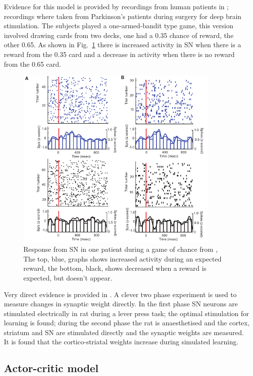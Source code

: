 \documentclass[11pt,a4paper]{scrartcl}
\begin{document}
Evidence for this model is provided by recordings from human patients
in \cite{ZaghloulEtAl2009a}; recordings where taken from Parkinson's
patients during surgery for deep brain stimulation. The subjects
played a one-armed-bandit type game, this version involved drawing
cards from two decks, one had a 0.35 chance of reward, the other
0.65. As shown in Fig.~\ref{fig:human} there is increased activity in
SN when there is a reward from the 0.35 card and a decrease in
activity when there is no reward from the 0.65 card.


\begin{figure}
\begin{center}
\includegraphics[width=10cm]{human.png}%
\end{center}
\caption{Response from SN in one patient during a game of chance from \cite{ZaghloulEtAl2009a}, The top, blue, graphs shows increased activity during an expected reward, the bottom, black, shows decreased when a reward is expected, but doesn't appear. \label{fig:human}}
\end{figure}

Very direct evidence is provided in
\cite{ReynoldsHylandWickens2001a}. A clever two phase experiment is
used to measure changes in synaptic weight directly. In the first
phase SN neurons are stimulated electrically in rat during a lever
press task; the optimal stimulation for learning is found; during the
second phase the rat is anaesthetised and the cortex, striatum and SN
are stimulated directly and the synaptic weights are measured. It is
found that the cortico-striatal weights increase during simulated
learning.

\subsection*{Actor-critic model}
\end{document}
